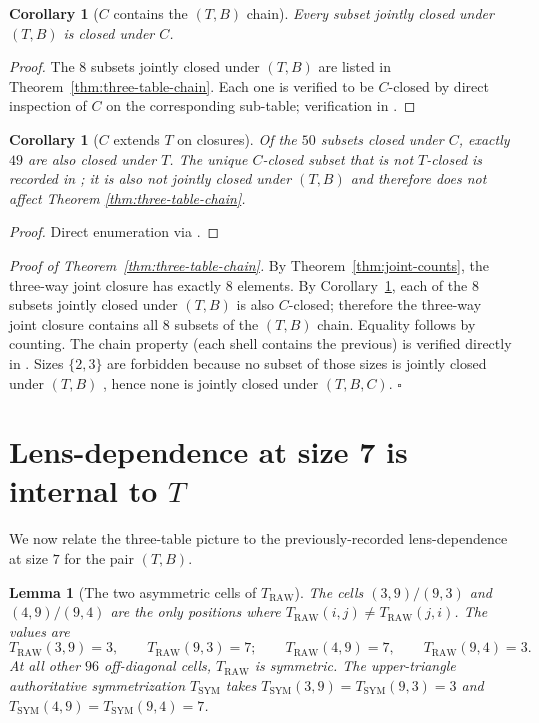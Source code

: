 \documentclass[11pt,reqno]{amsart}
\newtheorem{lemma}[theorem]{Lemma}
\newtheorem{corollary}[theorem]{Corollary}
\theoremstyle{definition}
\newcommand{\TRAW}{T_{\mathrm{RAW}}}
\newcommand{\TSYM}{T_{\mathrm{SYM}}}
\begin{document}
\begin{corollary}[$C$ contains the $(T,B)$ chain]
\label{cor:c-contains-tb}
Every subset jointly closed under $(T,B)$ is closed under $C$.
\end{corollary}

\begin{proof}
The $8$ subsets jointly closed under $(T,B)$ are listed in
Theorem~\ref{thm:three-table-chain}. Each one is verified to be
$C$-closed by direct inspection of $C$ on the corresponding
sub-table; verification in \cite{SFM2026}.
\end{proof}

\begin{corollary}[$C$ extends $T$ on closures]
\label{cor:c-extends-t}
Of the $50$ subsets closed under $C$, exactly $49$ are also closed
under $T$. The unique $C$-closed subset that is not $T$-closed is
recorded in \cite{SFM2026}; it is also not jointly closed under
$(T,B)$ and therefore does not affect Theorem
\ref{thm:three-table-chain}.
\end{corollary}

\begin{proof}
Direct enumeration via \cite{SFM2026}.
\end{proof}

\noindent\emph{Proof of Theorem~\ref{thm:three-table-chain}.}
By Theorem~\ref{thm:joint-counts}, the three-way joint closure
has exactly $8$ elements. By Corollary~\ref{cor:c-contains-tb},
each of the $8$ subsets jointly closed under $(T,B)$ is also
$C$-closed; therefore the three-way joint closure contains all
$8$ subsets of the $(T,B)$ chain. Equality follows by counting.
The chain property (each shell contains the previous) is verified
directly in \cite{SFM2026}. Sizes $\{2,3\}$ are forbidden because
no subset of those sizes is jointly closed under $(T,B)$
\cite{Sanders2026FourCore}, hence none is jointly closed under
$(T,B,C)$. $\square$

\section{Lens-dependence at size 7 is internal to $T$}
\label{sec:lens-internal}

We now relate the three-table picture to the previously-recorded
lens-dependence at size $7$ for the pair $(T,B)$.

\begin{lemma}[The two asymmetric cells of $\TRAW$]
\label{lem:asymmetric}
The cells $(3,9)/(9,3)$ and $(4,9)/(9,4)$ are the only positions
where $\TRAW(i,j)\neq\TRAW(j,i)$. The values are
\[
  \TRAW(3,9)=3,\qquad \TRAW(9,3)=7;\qquad
  \TRAW(4,9)=7,\qquad \TRAW(9,4)=3.
\]
At all other $96$ off-diagonal cells, $\TRAW$ is symmetric. The
upper-triangle authoritative symmetrization $\TSYM$ takes
$\TSYM(3,9)=\TSYM(9,3)=3$ and
$\TSYM(4,9)=\TSYM(9,4)=7$.
\end{lemma}
\end{document}
